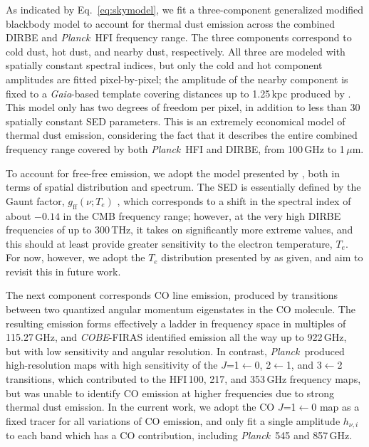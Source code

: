 \documentclass{aa}
\def\Planck{\textit{Planck}}
\def\COBE{\textit{COBE}}
\def\GAIA{\textit{Gaia}}
\begin{document}
As indicated by Eq.~\eqref{eq:skymodel}, we fit a three-component
generalized modified blackbody model to account for thermal dust
emission across the combined DIRBE and \Planck\ HFI frequency
range. The three components correspond to cold dust, hot dust, and
nearby dust, respectively. All three are modeled with spatially
constant spectral indices, but only the cold and hot component
amplitudes are fitted pixel-by-pixel; the amplitude of the nearby
component is fixed to a \GAIA-based template covering distances up to
1.25\,kpc produced by \citep{edenhofer:2024}. 
This model only has two degrees of freedom per pixel, in addition
to less than 30 spatially constant SED parameters. This is an
extremely economical model of thermal dust emission, considering the
fact that it describes the entire combined frequency range covered by
both \Planck\ HFI and DIRBE, from 100\,GHz to 1\,$\mu$m.

To account for free-free emission, we adopt the model presented by
\citet{planck2014-a11}, both in terms of spatial distribution and
spectrum. The SED is essentially defined by the Gaunt factor,
$g_{\mathrm{ff}}(\nu; T_e)$ \citep{dickinson:2003,draine:2011}, which corresponds to a shift in the
spectral index of about $-0.14$ in the CMB frequency range; however,
at the very high DIRBE frequencies of up to 300\,THz, it takes on
significantly more extreme values, and this should at least provide
greater sensitivity to the electron temperature, $T_e$. For now,
however, we adopt the $T_e$ distribution presented by
\citet{planck2014-a11} as given, and aim to revisit this in future work.

The next component corresponds CO line emission, produced by
transitions between two quantized angular momentum eigenstates in the
CO molecule. The resulting emission forms effectively a ladder in
frequency space in multiples of 115.27\,GHz, and \COBE-FIRAS identified
emission all the way up to 922\,GHz, but with low sensitivity and
angular resolution. In contrast, \Planck\ produced high-resolution
maps with high sensitivity of the $J$=1$\leftarrow$0, 2$\leftarrow$1,
and 3$\leftarrow$2 transitions, which contributed to the HFI\,100,
217, and 353\,GHz frequency maps, but was unable to identify CO
emission at higher frequencies due to strong thermal dust emission. In
the current work, we adopt the \citet{dame:2001} CO
$J$=1$\leftarrow$0 map as a fixed tracer for all variations of CO
emission, and only fit a single amplitude $h_{\nu,i}$ to each band
which has a CO contribution, including \Planck\ 545 and 857\,GHz.
\end{document}
